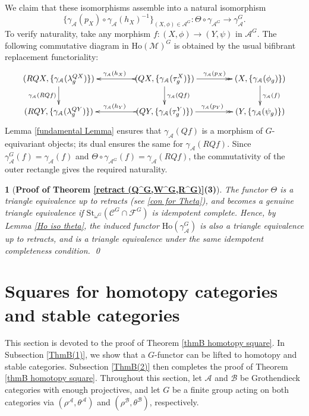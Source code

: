 \documentclass[12pt,twoside]{amsart}
\theoremstyle{bfupright head,slanted body}
\theoremstyle{bfupright head,upright body}
\newtheorem{bfhpg}[res]{}               \newtheorem*{bfhpg*}{}
\theoremstyle{fixed bf head,slanted body}
\theoremstyle{fixed bf head,upright body}
\theoremstyle{numbered paragraph}
\newenvironment{prf*}[1][Proof]{%
  \begin{proof}[\bf #1]
    \setcounter{equation}{0}
    \renewcommand{\theequation}{\arabic{equation}}}
  {\end{proof}
}
\numberwithin{equation}{res}
\newcommand{\calC}{\mathcal{C}}
\newcommand{\calF}{\mathcal{F}}
\newcommand{\calA}{\mathcal{A}}
\newcommand{\calB}{\mathcal{B}}
\newcommand{\calM}{\mathcal{M}}
\newcommand{\Ho}{\mathrm{Ho}}
\newcommand{\St}{\mathrm{St}}
\begin{document}
\begin{prf*}
We claim that these isomorphisms assemble into a natural isomorphism
\[
\{\gamma_{\calA}(p_X) \circ \gamma_{\calA}(h_X)^{-1}\}_{(X, \phi) \in \calA^G} :
\Theta \circ \gamma_{\calA^G} \to \gamma_{\calA}^G.
\]
To verify naturality, take any morphism \(f:(X,\phi)\to(Y,\psi)\) in \(\calA^G\). The following commutative diagram in \(\Ho(\calM)^G\) is obtained by the usual bifibrant replacement functoriality:
\[
\xymatrix@C=1.5CM@R=0.75CM{
   (RQX,\{\gamma_{\calA}(\lambda^{QX}_g)\})
\ar[d]_-{\gamma_{\calA}(RQf)}
&  (QX,\{\gamma_{\calA}(\tau^X_g)\})
\ar@{>->}[l]_-{\gamma_{\calA}(h_X)}
\ar@{->>}[r]^-{\gamma_{\calA}(p_X)}
\ar[d]^-{\gamma_{\calA}(Qf)}
&  (X,\{\gamma_{\calA}(\phi_g)\})
\ar[d]^-{\gamma_{\calA}(f)}           \\
   (RQY,\{\gamma_{\calA}(\lambda^{QY}_g)\})
&  (QY,\{\gamma_{\calA}(\tau^Y_g)\})
\ar@{>->}[l]_-{\gamma_{\calA}(h_Y)}
\ar@{->>}[r]^{\gamma_{\calA}(p_Y)}
&  (Y,\{\gamma_{\calA}(\psi_g)\})
}
\]
Lemma \ref{fundamental Lemma} ensures that \(\gamma_{\calA}(Qf)\) is a morphism of \(G\)-equivariant objects; its dual ensures the same for \(\gamma_{\calA}(RQf)\).
Since \(\gamma_{\calA}^G(f)=\gamma_{\calA}(f)\) and \(\Theta\circ\gamma_{\calA^G}(f)=\gamma_{\calA}(RQf)\), the commutativity of the outer rectangle gives the required naturality.
\end{prf*}

\begin{bfhpg}[\bf Proof of Theorem \ref{retract (Q^G,W^G,R^G)}(3)]
The functor \(\Theta\) is a triangle equivalence up to retracts (see \ref{con for Theta}), and becomes a genuine triangle equivalence if \(\St_{\omega^G}(\calC^G\cap\calF^G)\) is idempotent complete. Hence, by Lemma \ref{Ho iso theta}, the induced functor \(\Ho(\gamma_{\calA}^G)\) is also a triangle equivalence up to retracts, and is a triangle equivalence under the same idempotent completeness condition.
\qed
\end{bfhpg}

\section{Squares for homotopy categories and stable categories}
\label{Proofs of Theorem B}%
\noindent
This section is devoted to the proof of Theorem \ref{thmB homotopy square}. In Subsection \ref{ThmB(1)}, we show that a \(G\)-functor can be lifted to homotopy and stable categories. Subsection \ref{ThmB(2)} then completes the proof of Theorem \ref{thmB homotopy square}.
{\sf Throughout this section}, let \(\calA\) and \(\calB\) be Grothendieck categories with enough projectives, and let \(G\) be a finite group acting on both categories via \((\rho^\calA,\theta^\calA)\) and \((\rho^\calB,\theta^\calB)\), respectively.
\end{document}
